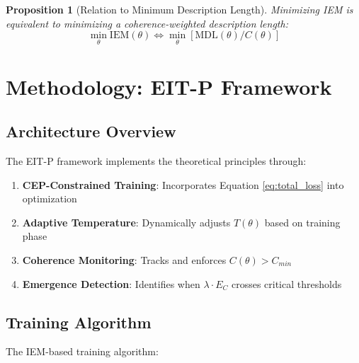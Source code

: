 \documentclass[12pt]{article}
\newtheorem{proposition}[theorem]{Proposition}
\begin{document}
\begin{proposition}[Relation to Minimum Description Length]
Minimizing IEM is equivalent to minimizing a coherence-weighted description length:
\begin{equation}
\min_{\theta} \text{IEM}(\theta) \Leftrightarrow \min_{\theta} \left[\text{MDL}(\theta) / C(\theta)\right]
\end{equation}
\end{proposition}

\section{Methodology: EIT-P Framework}

\subsection{Architecture Overview}

The EIT-P framework implements the theoretical principles through:

\begin{enumerate}
\item \textbf{CEP-Constrained Training}: Incorporates Equation \ref{eq:total_loss} into optimization
\item \textbf{Adaptive Temperature}: Dynamically adjusts $T(\theta)$ based on training phase
\item \textbf{Coherence Monitoring}: Tracks and enforces $C(\theta) > C_{min}$
\item \textbf{Emergence Detection}: Identifies when $\lambda \cdot E_C$ crosses critical thresholds
\end{enumerate}

\subsection{Training Algorithm}

The IEM-based training algorithm:
\end{document}
